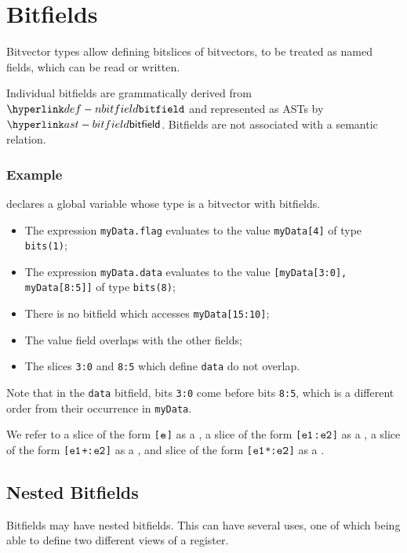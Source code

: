 \chapter{Bitfields\label{chap:Bitfields}}

Bitvector types allow defining bitslices of bitvectors, to be treated as named
fields, which can be read or written. 

Individual bitfields are grammatically derived from $\Nbitfield$ and represented as ASTs by $\bitfield$.
Bitfields are not associated with a semantic relation.

\subsection{Example}
 declares a global variable whose type is a bitvector with bitfields.
\begin{itemize}
  \item The expression \texttt{myData.flag} evaluates to the value \texttt{myData[4]} of type \texttt{bits(1)};
  \item The expression \texttt{myData.data} evaluates to the value \texttt{[myData[3:0], myData[8:5]]} of type \texttt{bits(8)};
  \item There is no bitfield which accesses \texttt{myData[15:10]};
  \item The value field overlaps with the other fields;
  \item The slices \texttt{3:0} and \texttt{8:5} which define \texttt{data} do not overlap.
\end{itemize}
Note that in the \texttt{data} bitfield, bits \texttt{3:0} come before bits \texttt{8:5},
which is a different order from their occurrence in \texttt{myData}.

\hypertarget{def-singleslice}{}
\hypertarget{def-rangeslice}{}
\hypertarget{def-lengthslice}{}
\hypertarget{def-scaledslice}{}
We refer to a slice of the form \texttt{[$\texttt{e}$]} as a \singleslice,
a slice of the form \texttt{[$\texttt{e1}$:$\texttt{e2}$]} as a \rangeslice,
a slice of the form \texttt{[$\texttt{e1}$+:$\texttt{e2}$]} as a \lengthslice,
and slice of the form \texttt{[$\texttt{e1}$*:$\texttt{e2}$]} as a \scaledslice.

\section{Nested Bitfields}
Bitfields may have nested bitfields. This can have several uses, one of which being able to define two
different views of a register.


